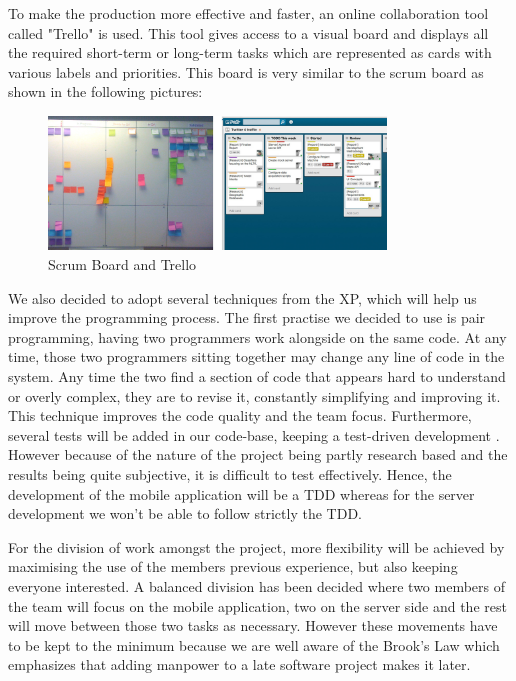 To make the production more effective and faster, an online collaboration tool called "Trello" is used. This tool gives access to a visual board and displays all the required short-term or long-term tasks which are represented as cards with various labels and priorities. This board is very similar to the scrum board as shown in the following pictures:

\begin{figure}[here]
\begin{minipage}{\textwidth}
\begin{center}
\includegraphics[width=0.8\textwidth]{images/scrumboard.jpg}
\end{center}
\vspace{-20pt}
\caption[Caption for LOF]{Scrum Board and Trello\footnotemark}
\end{minipage} 
\end{figure}


We also decided to adopt several techniques from the XP, which will help us improve the programming process. The first practise we decided to use is pair programming, having two programmers work alongside on the same code. At any time, those two programmers sitting together may change any line of code in the system. Any time the two find a section of code that appears hard to understand or overly complex, they are to revise it, constantly simplifying and improving it. This technique improves the code quality and the team focus. Furthermore, several tests will be added in our code-base, keeping a test-driven development . However because of the nature of the project being partly research based and the results being quite subjective, it is difficult to test effectively. Hence, the development of the mobile application will be a TDD whereas for the server development we won't be able to follow strictly the TDD.\cite{Cockburn}

For the division of work amongst the project, more flexibility will be achieved by maximising the use of the members previous experience, but also keeping everyone interested. A balanced division has been decided where two members of the team will focus on the mobile application, two on the server side and the rest will move between those two tasks as necessary. However these movements have to be kept to the minimum because we are well aware of the Brook's Law which emphasizes that adding manpower to a late software project makes it later.\cite{Brooks}


